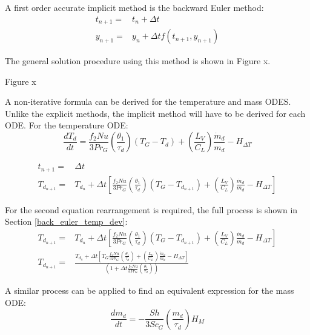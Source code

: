 \documentclass[../Interim_Report_Master]{subfiles}
\begin{document}
A first order accurate implicit method is the backward Euler method:
\begin{subequations}
\begin{eqnarray}
t_{n+1} =& t_n + \Delta t \\
y_{n+1} =& y_n + \Delta t f(t_{n+1},y_{n+1})
\end{eqnarray}
\end{subequations} 

The general solution procedure using this method is shown in Figure x.

Figure x

A non-iterative formula can be derived for the temperature and mass ODES. Unlike the explicit methods, the implicit method will have to be derived for each ODE. For the temperature ODE:
\begin{equation}
\frac{dT_{d}}{dt} = \frac{f_{2}Nu}{3Pr_{G}}\left(\frac{\theta_1}{\tau_d}\right)(T_{G}-T_{d}) + \left(\frac{L_{V}}{C_{L}}\right)\frac{\dot{m}_{d}}{m_{d}} - H_{\Delta T}
\end{equation}

\begin{subequations}
\begin{align}
t_{n+1} =& \Delta t \\
T_{d_{n+1}} =& T_{d_{n}} + \Delta t \left[\frac{f_{2}Nu}{3Pr_{G}}\left(\frac{\theta_1}{\tau_d}\right)(T_{G}-T_{d_{n+1}}) + \left(\frac{L_{V}}{C_{L}}\right)\frac{\dot{m}_{d}}{m_{d}} - H_{\Delta T}\right]
\end{align}
\end{subequations} 

For the second equation rearrangement is required, the full process is shown in Section \ref{back_euler_temp_dev}:
\begin{subequations}
\begin{align}
T_{d_{n+1}} =& T_{d_{n}} + \Delta t \left[\frac{f_{2}Nu}{3Pr_{G}}\left(\frac{\theta_1}{\tau_d}\right)(T_{G}-T_{d_{n+1}}) + \left(\frac{L_{V}}{C_{L}}\right)\frac{\dot{m}_{d}}{m_{d}} - H_{\Delta T}\right] \\
T_{d_{n+1}} =& \frac{T_{d_{n}} + \Delta t \left[T_{G}\frac{f_{2}Nu}{3Pr_{G}}\left(\frac{\theta_1}{\tau_d}\right) + \left(\frac{L_{V}}{C_{L}}\right)\frac{\dot{m}_{d}}{m_{d}} - H_{\Delta T}\right]}{\left(1+\Delta t\frac{f_{2}Nu}{3Pr_{G}}\left(\frac{\theta_1}{\tau_d}\right)\right)} 
\end{align}
\end{subequations} 

A similar process can be applied to find an equivalent expression for the mass ODE:
\begin{equation}
\frac{dm_{d}}{dt} = -\frac{Sh}{3Sc_{G}}\left(\frac{m_{d}}{\tau_{d}}\right)H_M
\end{equation}
\end{document}
